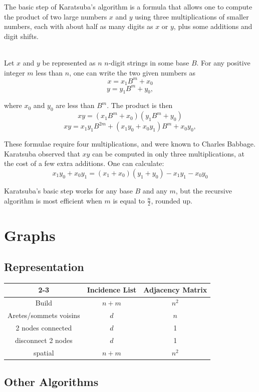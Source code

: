 \documentclass[a4paper, 12pt]{article}
\begin{document}
The basic step of Karatsuba's algorithm is a formula that allows one to compute the product of two large numbers $x$ and $y$ using three multiplications of smaller numbers, each with about half as many digits as $x$ or $y$, plus some additions and digit shifts.

~\\
Let $x$ and $y$ be represented as $n$ $n$-digit strings in some base $B$. For any positive integer $m$ less than $n$, one can write the two given numbers as
$$x = x_{1}B^{m}+x_{0}$$
$$y = y_{1}B^{m}+y_{0},$$

where $x_{0}$ and $y_{0}$ are less than $B^{m}$. The product is then
$$xy=(x_{1}B^{m}+x_{0})(y_{1}B^{m}+y_{0})$$
$$xy=x_{1}y_{1}B^{2m}+(x_{1}y_{0}+x_{0}y_{1})B^{m}+x_{0}y_{0},$$

These formulae require four multiplications, and were known to Charles Babbage. Karatsuba observed that $xy$ can be computed in only three multiplications, at the cost of a few extra additions. One can calculate:
$$x_{1}y_{0}+x_{0}y_{1}=(x_{1}+x_{0})(y_{1}+y_{0})-x_{1}y_{1}-x_{0}y_{0}$$

Karatsuba's basic step works for any base $B$ and any $m$, but the recursive algorithm is most efficient when $m$ is equal to $\frac{n}{2}$, rounded up.

\section{Graphs}

  \subsection{Representation}

\begin{center}
\begin{tabular}{| c | c | c |}
\cline{2-3}
\multicolumn{1}{c |}{} & Incidence List & Adjacency Matrix \\
\hline
Build & $n+m$ & $n^2$ \\
\hline
Aretes/sommets voisins & $d$ & $n$ \\
\hline
2 nodes connected & $d$ & 1 \\
\hline
disconnect 2 nodes & $d$ & 1 \\
\hline
spatial & $n+m$ & $n^2$ \\
\hline
\end{tabular}
\end{center}

  \subsection{Other Algorithms}
\end{document}
